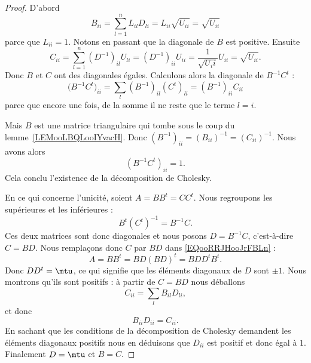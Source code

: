 \begin{proof}
	D'abord
	\begin{equation}
		B_{ii}=\sum_{l=1}^nL_{il}D_{li}=L_{ii}\sqrt{ U_{ii} }=\sqrt{ U_{ii} }
	\end{equation}
	parce que \( L_{ii}=1\). Notons en passant que la diagonale de \( B\) est positive.  Ensuite
	\begin{equation}
		C_{ii}=\sum_{l=1}^n(D^{-1})_{il}U_{li}=(D^{-1})_{ii}U_{ii}=\frac{1}{ \sqrt{ U_ii } }U_{ii}=\sqrt{ U_{ii} }.
	\end{equation}
	Donc \( B\) et \( C\) ont des diagonales égales. Calculons alors la diagonale de \( B^{-1}C^t\) :
	\begin{equation}
		\big( B^{-1}C^t \big)_{ii}=\sum_l(B^{-1})_{il}(C^t)_{li}=(B^{-1})_{ii}C_{ii}
	\end{equation}
	parce que encore une fois, de la somme il ne reste que le terme \( l=i\).

	Mais \( B\) est une matrice triangulaire qui tombe sous le coup du lemme~\ref{LEMooLBQLooIYvacH}. Donc \( (B^{-1})_{ii}=(B_{ii})^{-1}=(C_{ii})^{-1}\). Nous avons alors
	\begin{equation}
		(B^{-1}C^t)_{ii}=1.
	\end{equation}
	Cela conclu l'existence de la décomposition de Cholesky.

	En ce qui concerne l'unicité, soient \( A=BB^t=CC^t\). Nous regroupons les supérieures et les inférieures :
	\begin{equation}        \label{EQooRRJHooJrFBLn}
		B^t(C^t)^{-1}=B^{-1}C.
	\end{equation}
	Ces deux matrices sont donc diagonales et nous posons \( D=B^{-1} C\), c'est-à-dire \( C=BD\). Nous remplaçons donc \( C\) par \( BD\) dans \eqref{EQooRRJHooJrFBLn} :
	\begin{equation}
		A=BB^t=BD(BD)^t=BDD^tB^t.
	\end{equation}
	Donc \( DD^t=\mtu\), ce qui signifie que les éléments diagonaux de \( D\) sont \( \pm 1\). Nous montrons qu'ils sont positifs : à partir de \( C=BD\) nous déballons
	\begin{equation}
		C_{ii}=\sum_lB_{il}D_{li},
	\end{equation}
	et donc
	\begin{equation}
		B_{ii}D_{ii}=C_{ii}.
	\end{equation}
	En sachant que les conditions de la décomposition de Cholesky demandent les éléments diagonaux positifs nous en déduisons que \( D_{ii}\) est positif et donc égal à \( 1\). Finalement \( D=\mtu\) et \( B=C\).
\end{proof}

